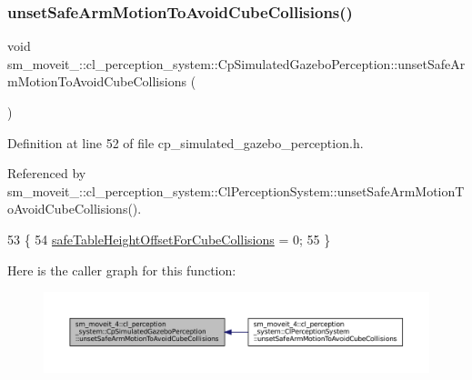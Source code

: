 \mbox{\label{classsm__moveit__4_1_1cl__perception__system_1_1CpSimulatedGazeboPerception_a7f5d68f2ff7dd0ade9756058e790efa1}} 
\subsubsection{\texorpdfstring{unset\+Safe\+Arm\+Motion\+To\+Avoid\+Cube\+Collisions()}{unsetSafeArmMotionToAvoidCubeCollisions()}}
{\footnotesize\ttfamily void sm\+\_\+moveit\+\_\+::cl\+\_\+perception\+\_\+system\+::\+Cp\+Simulated\+Gazebo\+Perception\+::unset\+Safe\+Arm\+Motion\+To\+Avoid\+Cube\+Collisions (\begin{DoxyParamCaption}{ }\end{DoxyParamCaption})\hspace{0.3cm}{\ttfamily [inline]}}



Definition at line 52 of file cp\+\_\+simulated\+\_\+gazebo\+\_\+perception.\+h.



Referenced by sm\+\_\+moveit\+\_\+::cl\+\_\+perception\+\_\+system\+::\+Cl\+Perception\+System\+::unset\+Safe\+Arm\+Motion\+To\+Avoid\+Cube\+Collisions().


\begin{DoxyCode}
53             \{
54                  \hyperlink{classsm__moveit__4_1_1cl__perception__system_1_1CpSimulatedGazeboPerception_a6b6bafbddde1f72c81bf54aa75872151}{safeTableHeightOffsetForCubeCollisions} = 0;
55             \}
\end{DoxyCode}
Here is the caller graph for this function\+:
\nopagebreak
\begin{figure}[H]
\begin{center}
\leavevmode
\includegraphics[width=350pt]{classsm__moveit__4_1_1cl__perception__system_1_1CpSimulatedGazeboPerception_a7f5d68f2ff7dd0ade9756058e790efa1_icgraph}
\end{center}
\end{figure}


